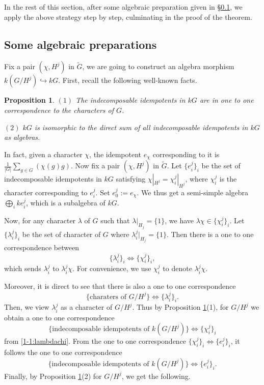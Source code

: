 \documentclass[11pt,reqno]{amsart}
\newtheorem{proposition}[theorem]{Proposition}
\theoremstyle{definition}
\begin{document}
In the rest of this section,
after some algebraic preparation given in \S\ref{subsect:algprep},
we apply the above strategy step by step,  
culminating in the proof of the
theorem.

\subsection{Some algebraic preparations}\label{subsect:algprep}



Fix a pair $(\chi, H^j)$ in $\tilde{G}$, 
we are going to 
construct an algebra morphism $k(G / H^j) \hookrightarrow kG$. 
First, recall the following well-known facts.

\begin{proposition}\label{ReChaId}
$(1)$ The indecomposable idempotents in $kG$ are in one to one 
correspondence to the characters of $G$. 		

$(2)$ $kG$ is isomorphic to the direct sum of all indecomposable 
idempotents in $kG$ as algebras. 	
\end{proposition}

In fact, given a character $\chi$,
the idempotent $e_{\chi}$ 
corresponding to 
it is
$\displaystyle\frac{1}{|G|} \sum\limits_{g \in G} (\chi(g) g )$. 
Now fix a
pair $(\chi, H^j)$ in $\tilde{G}$.
Let $\{e^{j}_{i} \}_{i}$ be the set of indecomposable idempotents in 
$kG$ satisfying $\chi|_{H^j} = \chi_{i}^j|_{H^j}$, 
where $\chi^{j}_{i}$ 
is the character
corresponding to $e^{j}_i$. 
Set $e_{0}^{j} := e_{\chi}$. 
We thus 
get a semi-simple algebra $\bigoplus_{i} ke_{i}^j$, 
which is a subalgebra of $kG$. 

Now, for any character $\lambda$ 
of $G$ such that $\lambda|_{H_j} = \{1 \}$, we have 
$\lambda\chi \in \{\chi_i^j \}_i$. Let $\{\lambda_i^j \}_i$ be the set of character of $G$ where 
$\lambda_i^{j}|_{H_j} = \{1 \}$. Then there is a one to one correspondence 
between 
\begin{equation}
\label{1-1:lambdachi}
\{\lambda_i^j \}_i\Leftrightarrow
\{\chi_i^j \}_i,    
\end{equation}
which
sends $\lambda_i^j$ to $\lambda_i^j \chi$. 
For convenience, we use $\chi^j_i$ to denote
$\lambda_i^j \chi$. 

Moreover, it is direct to see that 
there is also a one to one correspondence 
$$\{\mbox{charaters of $G/H^j$}\}
\Leftrightarrow
\{\lambda_i^j\}_i.
$$
Then, we view $\lambda_i^j$ as 
a character of $G/H^j$. 
Thus by Proposition 
\ref{ReChaId}(1), for $G/H^j$  
we obtain a one to one correspondence 
$$
\{\mbox{indecomposable
idempotents of $k(G/H^j)$}\}
\Leftrightarrow
\{\chi_i^j\}_i
$$
from \eqref{1-1:lambdachi}. 
From the one to one correspondence $\{\chi_i^j \}_i\Leftrightarrow
\{e_i^j \}_i$,  
it follows the one to one 
correspondence
$$\{\mbox{indecomposable idempotents of $k(G/H^j)$}\}\Leftrightarrow\{e_i^j \}_i.$$
Finally, by Proposition \ref{ReChaId}(2) 
for $G/H^j$, we get the following.
\end{document}
